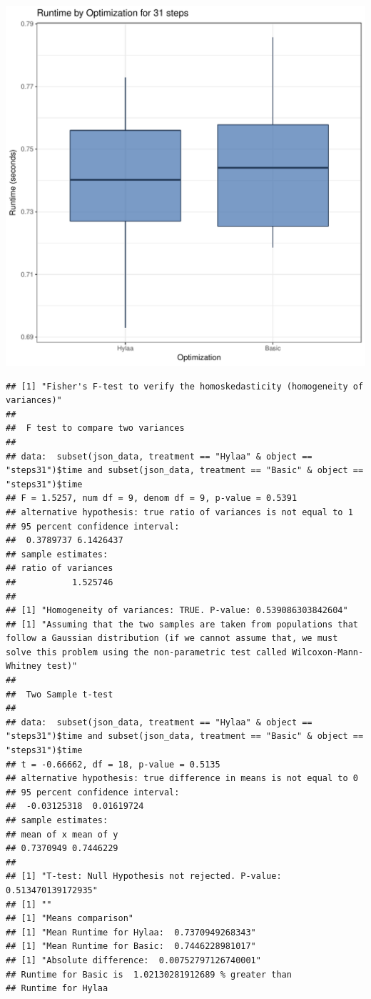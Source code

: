 \documentclass{article}\usepackage[]{graphicx}\usepackage[]{color}
\makeatletter
\def\maxwidth{ %
  \ifdim\Gin@nat@width>\linewidth
    \linewidth
  \else
    \Gin@nat@width
  \fi
}
\newenvironment{kframe}{%
 \def\at@end@of@kframe{}%
 \ifinner\ifhmode%
  \def\at@end@of@kframe{\end{minipage}}%
  \begin{minipage}{\columnwidth}%
 \fi\fi%
 \def\FrameCommand##1{\hskip\@totalleftmargin \hskip-\fboxsep
 \colorbox{shadecolor}{##1}\hskip-\fboxsep
     \hskip-\linewidth \hskip-\@totalleftmargin \hskip\columnwidth}%
 \MakeFramed {\advance\hsize-\width
   \@totalleftmargin\z@ \linewidth\hsize
   \@setminipage}}%
 {\par\unskip\endMakeFramed%
 \at@end@of@kframe}
\newenvironment{knitrout}{}{} %
\makeatother
\begin{document}
\begin{knitrout}
\color{fgcolor}
\includegraphics[width=\maxwidth]{figure/RH3_steps31-1} 
\begin{kframe}\begin{verbatim}
## [1] "Fisher's F-test to verify the homoskedasticity (homogeneity of variances)"
## 
## 	F test to compare two variances
## 
## data:  subset(json_data, treatment == "Hylaa" & object == "steps31")$time and subset(json_data, treatment == "Basic" & object == "steps31")$time
## F = 1.5257, num df = 9, denom df = 9, p-value = 0.5391
## alternative hypothesis: true ratio of variances is not equal to 1
## 95 percent confidence interval:
##  0.3789737 6.1426437
## sample estimates:
## ratio of variances 
##           1.525746 
## 
## [1] "Homogeneity of variances: TRUE. P-value: 0.539086303842604"
## [1] "Assuming that the two samples are taken from populations that follow a Gaussian distribution (if we cannot assume that, we must solve this problem using the non-parametric test called Wilcoxon-Mann-Whitney test)"
## 
## 	Two Sample t-test
## 
## data:  subset(json_data, treatment == "Hylaa" & object == "steps31")$time and subset(json_data, treatment == "Basic" & object == "steps31")$time
## t = -0.66662, df = 18, p-value = 0.5135
## alternative hypothesis: true difference in means is not equal to 0
## 95 percent confidence interval:
##  -0.03125318  0.01619724
## sample estimates:
## mean of x mean of y 
## 0.7370949 0.7446229 
## 
## [1] "T-test: Null Hypothesis not rejected. P-value: 0.513470139172935"
## [1] ""
## [1] "Means comparison"
## [1] "Mean Runtime for Hylaa:  0.7370949268343"
## [1] "Mean Runtime for Basic:  0.7446228981017"
## [1] "Absolute difference:  0.00752797126740001"
## Runtime for Basic is  1.02130281912689 % greater than 
## Runtime for Hylaa
\end{verbatim}
\end{kframe}
\end{knitrout}
\end{document}
